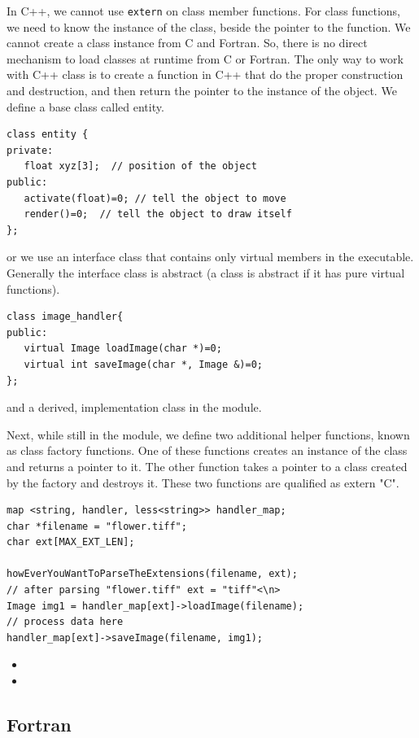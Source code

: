 In C++, we cannot use \verb!extern! on class member functions.  For
class functions, we need to know the instance of the class, beside the
pointer to the function.  We cannot create a class instance from C and
Fortran. So, there is no direct mechanism to load classes at runtime
from C or Fortran.  The only way to work with C++ class is to create a
function in C++ that do the proper construction and destruction, and
then return the pointer to the instance of the object.  We define a
base class called entity.
\begin{lstlisting}
class entity {
private:
   float xyz[3];  // position of the object
public:
   activate(float)=0; // tell the object to move
   render()=0;  // tell the object to draw itself
};
\end{lstlisting}
or we use an interface class that contains only virtual members in the
executable. Generally the interface class is abstract (a class is
abstract if it has pure virtual functions).
\begin{lstlisting}
class image_handler{
public:
   virtual Image loadImage(char *)=0;
   virtual int saveImage(char *, Image &)=0;
};
\end{lstlisting}
and a derived, implementation class in the module.

Next, while still in the module, we define two additional helper
functions, known as class factory functions. One of these functions
creates an instance of the class and returns a pointer to it. The
other function takes a pointer to a class created by the factory and
destroys it. These two functions are qualified as extern "C".
\begin{lstlisting}
map <string, handler, less<string>> handler_map;
char *filename = "flower.tiff";
char ext[MAX_EXT_LEN];

howEverYouWantToParseTheExtensions(filename, ext);
// after parsing "flower.tiff" ext = "tiff"<\n>
Image img1 = handler_map[ext]->loadImage(filename);
// process data here
handler_map[ext]->saveImage(filename, img1);
\end{lstlisting}



\begin{itemize}
\item {}
\item {}
\end{itemize}

\subsection{Fortran}
\label{sec:fortran-2}

